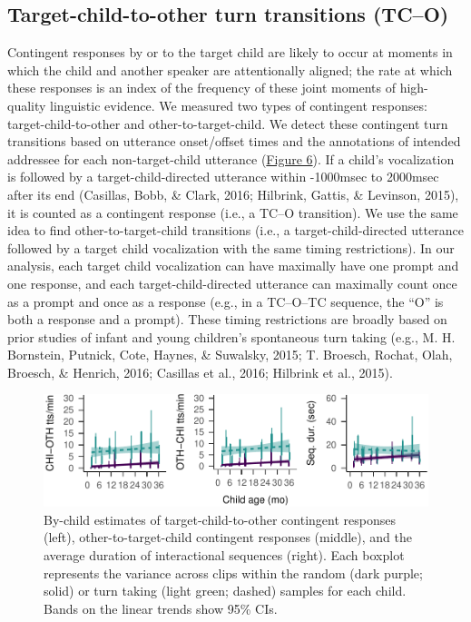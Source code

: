 \documentclass[floatsintext,man]{apa6}
\theoremstyle{definition}
\theoremstyle{definition}
\theoremstyle{definition}
\theoremstyle{remark}
\begin{document}
\subsection{Target-child-to-other turn transitions
(TC--O)}\label{target-child-to-other-turn-transitions-tco}

Contingent responses by or to the target child are likely to occur at
moments in which the child and another speaker are attentionally
aligned; the rate at which these responses is an index of the frequency
of these joint moments of high-quality linguistic evidence. We measured
two types of contingent responses: target-child-to-other and
other-to-target-child. We detect these contingent turn transitions based
on utterance onset/offset times and the annotations of intended
addressee for each non-target-child utterance
(\protect\hyperlink{fig6}{Figure 6}). If a child's vocalization is
followed by a target-child-directed utterance within -1000msec to
2000msec after its end (Casillas, Bobb, \& Clark, 2016; Hilbrink,
Gattis, \& Levinson, 2015), it is counted as a contingent response
(i.e., a TC--O transition). We use the same idea to find
other-to-target-child transitions (i.e., a target-child-directed
utterance followed by a target child vocalization with the same timing
restrictions). In our analysis, each target child vocalization can have
maximally have one prompt and one response, and each
target-child-directed utterance can maximally count once as a prompt and
once as a response (e.g., in a TC--O--TC sequence, the \enquote{O} is
both a response and a prompt). These timing restrictions are broadly
based on prior studies of infant and young children's spontaneous turn
taking (e.g., M. H. Bornstein, Putnick, Cote, Haynes, \& Suwalsky, 2015;
T. Broesch, Rochat, Olah, Broesch, \& Henrich, 2016; Casillas et al.,
2016; Hilbrink et al., 2015).

\begin{figure}
\centering
\includegraphics{Tseltal-CLE_files/figure-latex/fig7-1.pdf}
\caption{\label{fig:fig7}By-child estimates of target-child-to-other
contingent responses (left), other-to-target-child contingent responses
(middle), and the average duration of interactional sequences (right).
Each boxplot represents the variance across clips within the random
(dark purple; solid) or turn taking (light green; dashed) samples for
each child. Bands on the linear trends show 95\% CIs.}
\end{figure}
\end{document}

